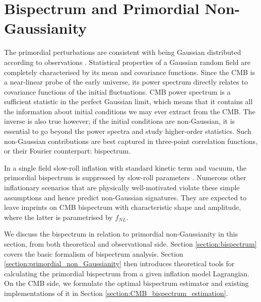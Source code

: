 \chapter{Bispectrum and Primordial Non-Gaussianity}

\ifpdf
    \graphicspath{{Chapter3/Figs/Raster/}{Chapter3/Figs/PDF/}{Chapter3/Figs/}}
\else
    \graphicspath{{Chapter3/Figs/Vector/}{Chapter3/Figs/}}
\fi

The primordial perturbations are consistent with being Gaussian distributed according to observations \cite{PlanckCollaboration2018}. Statistical properties of a Gaussian random field are completely characterised by its mean and covariance functions. Since the CMB is a near-linear probe of the early universe, its power spectrum directly relates to covariance functions of the initial fluctuations. CMB power spectrum is a sufficient statistic in the perfect Gaussian limit, which means that it contains all the information about initial conditions we may ever extract from the CMB. The inverse is also true however; if the initial conditions are non-Gaussian, it is essential to go beyond the power spectra and study higher-order statistics. Such non-Gaussian contributions are best captured in three-point correlation functions, or their Fourier counterpart: bispectrum.

In a single field slow-roll inflation with standard kinetic term and vacuum, the primordial bispectrum is suppressed by slow-roll parameters \cite{Maldacena2013}. Numerous other inflationary scenarios that are physically well-motivated violate these simple assumptions and hence predict non-Gaussian signatures. They are expected to leave imprints on CMB bispectrum with characteristic shape and amplitude, where the latter is parametrised by $f_{NL}$.

We discuss the bispectrum in relation to primordial non-Gaussianity in this section, from both theoretical and observational side. Section \ref{section:bispectrum} covers the basic formalism of bispectrum analysis. Section \ref{section:primordial_non_Gaussianity} then introduces theoretical tools for calculating the primordial bispectrum from a given inflation model Lagrangian. On the CMB side, we formulate the optimal bispectrum estimator and existing implementations of it in Section \ref{section:CMB_bispectrum_estimation}.


